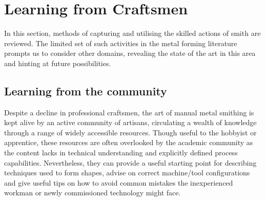 



\newpage
\section{Learning from Craftsmen} \label{sec:Learning}

In this section, methods of capturing and utilising the skilled actions of smith are reviewed. The limited set of such activities in the metal forming literature prompts us to consider other domains, revealing the state of the art in this area and hinting at future possibilities. 

\subsection{Learning from the community \label{sec:LfC}}
Despite a decline in professional craftsmen, the art of manual metal smithing is kept alive by an active community of artisans, circulating a wealth of knowledge through a range of widely accessible resources. Though useful to the hobbyist or apprentice, these resources are often overlooked by the academic community as the content lacks in technical understanding and explicitly defined process capabilities. Nevertheless, they can provide a useful starting point for describing techniques used to form shapes, advise on correct machine/tool configurations and give useful tips on how to avoid common mistakes the inexperienced workman or newly commissioned technology might face.

